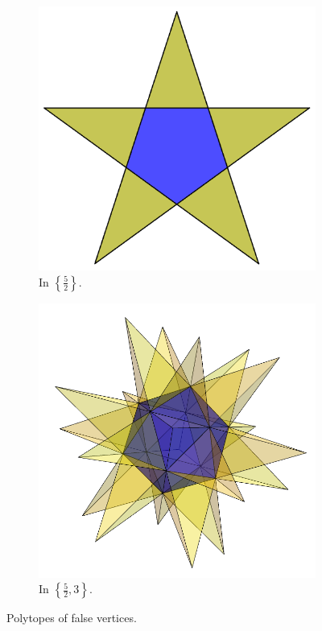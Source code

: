 \documentclass{article}
\theoremstyle{definition}
\begin{document}
	\begin{figure}[H]
		\begin{center}
			\begin{subfigure}[t]{0.4\linewidth}
		\centering
		\includegraphics[width=\linewidth]{fig1a}
		\caption{In $\left\{\frac{5}{2}\right\}$.}
		\end{subfigure}
		\begin{subfigure}[t]{0.4\linewidth}
			\centering
			\includegraphics[width=\linewidth]{fig1b}
			\caption{In $\left\{\frac{5}{2},3\right\}$.}
		\end{subfigure}
		\end{center}
		\caption{Polytopes of false vertices.}\label{fig:1}
	\end{figure}
	
\end{document}
